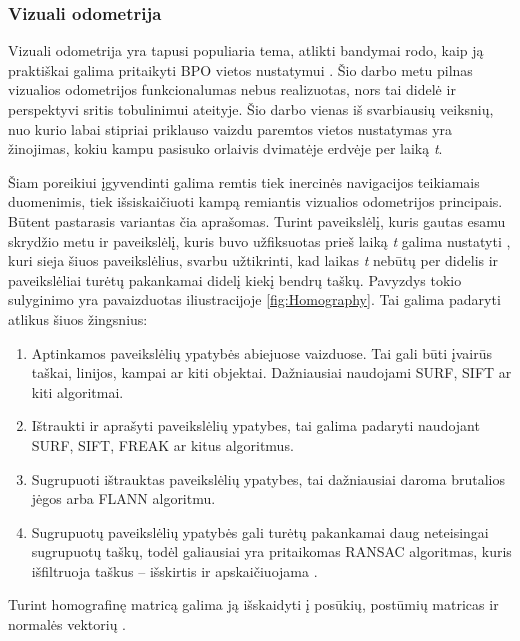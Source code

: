 \documentclass[a4paper,12pt]{article}
\begin{document}
	\subsubsection{Vizuali odometrija}
		\label{sec:VisualOdometry}
			
		Vizuali odometrija yra tapusi populiaria tema, atlikti bandymai rodo, kaip ją praktiškai galima pritaikyti \gls{BPO} vietos nustatymui	\cite{SVO:FastVisualodOmetry}.  Šio darbo metu pilnas vizualios odometrijos funkcionalumas nebus realizuotas, nors tai didelė ir perspektyvi sritis tobulinimui ateityje. Šio darbo vienas iš svarbiausių veiksnių, nuo kurio labai stipriai priklauso vaizdu paremtos vietos nustatymas yra žinojimas, kokiu kampu pasisuko orlaivis dvimatėje erdvėje per laiką \textit{t}.
			
		Šiam poreikiui įgyvendinti galima remtis tiek inercinės navigacijos teikiamais duomenimis, tiek išsiskaičiuoti kampą remiantis vizualios odometrijos principais. Būtent pastarasis variantas čia aprašomas. Turint paveikslėlį, kuris gautas esamu skrydžio metu ir paveikslėlį, kuris buvo užfiksuotas prieš laiką \textit{t} galima nustatyti , kuri sieja šiuos paveikslėlius, svarbu užtikrinti, kad laikas \textit{t} nebūtų per didelis ir paveikslėliai turėtų pakankamai didelį kiekį bendrų taškų. Pavyzdys tokio sulyginimo yra pavaizduotas iliustracijoje \ref{fig:Homography}. Tai galima padaryti atlikus šiuos žingsnius:
		\begin{enumerate}[1.]
			\setlength\itemsep{0em}
			\item Aptinkamos paveikslėlių ypatybės abiejuose vaizduose. Tai gali būti įvairūs taškai, linijos, kampai ar kiti objektai. Dažniausiai naudojami \gls{SURF}, \gls{SIFT} ar kiti algoritmai.
			\item Ištraukti ir aprašyti paveikslėlių ypatybes, tai galima padaryti naudojant \gls{SURF}, \gls{SIFT}, \gls{FREAK} ar kitus algoritmus.
			\item Sugrupuoti ištrauktas paveikslėlių ypatybes, tai dažniausiai daroma brutalios jėgos arba \gls{FLANN} algoritmu.
			\item Sugrupuotų paveikslėlių ypatybės gali turėtų pakankamai daug neteisingai sugrupuotų taškų, todėl galiausiai yra pritaikomas \gls{RANSAC} algoritmas, kuris išfiltruoja taškus – išskirtis ir apskaičiuojama .
		\end{enumerate}
		Turint homografinę matricą galima ją išskaidyti į posūkių, postūmių matricas ir normalės vektorių \cite{malis:inria-00174036}.
				
\end{document}
